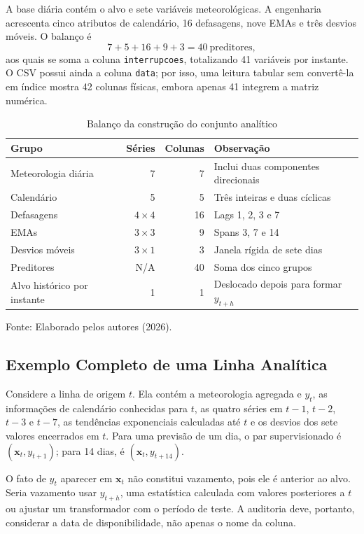A base diária contém o alvo e sete variáveis meteorológicas. A engenharia acrescenta cinco atributos de calendário, 16 defasagens, nove EMAs e três desvios móveis. O balanço é
\begin{equation}
    7+5+16+9+3=40\ \text{preditores},
\end{equation}
aos quais se soma a coluna \texttt{interrupcoes}, totalizando 41 variáveis por instante. O CSV possui ainda a coluna \texttt{data}; por isso, uma leitura tabular sem convertê-la em índice mostra 42 colunas físicas, embora apenas 41 integrem a matriz numérica.

\begin{table}[H]
\centering
\caption{Balanço da construção do conjunto analítico}
\label{tab:balanco_features}
\small
\begin{tabularx}{\textwidth}{X r r X}
\toprule
\textbf{Grupo} & \textbf{Séries} & \textbf{Colunas} & \textbf{Observação} \\
\midrule
Meteorologia diária & 7 & 7 & Inclui duas componentes direcionais \\
Calendário & 5 & 5 & Três inteiras e duas cíclicas \\
Defasagens & $4\times4$ & 16 & Lags 1, 2, 3 e 7 \\
EMAs & $3\times3$ & 9 & Spans 3, 7 e 14 \\
Desvios móveis & $3\times1$ & 3 & Janela rígida de sete dias \\
Preditores & N/A & 40 & Soma dos cinco grupos \\
Alvo histórico por instante & 1 & 1 & Deslocado depois para formar $y_{t+h}$ \\
\bottomrule
\end{tabularx}
\small{Fonte: Elaborado pelos autores (2026).}
\end{table}

\subsection{Exemplo Completo de uma Linha Analítica}

Considere a linha de origem $t$. Ela contém a meteorologia agregada e $y_t$, as informações de calendário conhecidas para $t$, as quatro séries em $t-1$, $t-2$, $t-3$ e $t-7$, as tendências exponenciais calculadas até $t$ e os desvios dos sete valores encerrados em $t$. Para uma previsão de um dia, o par supervisionado é $(\mathbf{x}_t,y_{t+1})$; para 14 dias, é $(\mathbf{x}_t,y_{t+14})$.

O fato de $y_t$ aparecer em $\mathbf{x}_t$ não constitui vazamento, pois ele é anterior ao alvo. Seria vazamento usar $y_{t+h}$, uma estatística calculada com valores posteriores a $t$ ou ajustar um transformador com o período de teste. A auditoria deve, portanto, considerar a data de disponibilidade, não apenas o nome da coluna.

